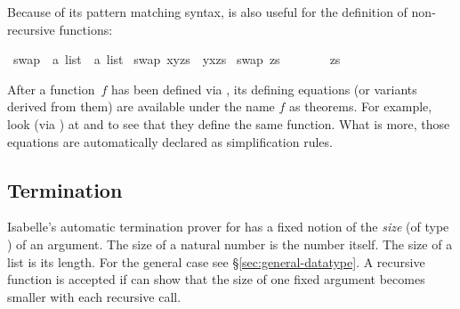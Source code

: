 \begin{isabellebody}
\begin{isamarkuptext}
Because of its pattern matching syntax,  is also useful
for the definition of non-recursive functions:%
\end{isamarkuptext}%
\isamarkuptrue%
\isamarkupfalse%
\ swap{}{}\ {\isacharcolon}{\isacharcolon}\ {\isachardoublequoteopen}{\isacharprime}a\ list\ {\isasymRightarrow}\ {\isacharprime}a\ list{\isachardoublequoteclose}\ \isanewline
{\isachardoublequoteopen}swap{}{}\ {\isacharparenleft}x{\isacharhash}y{\isacharhash}zs{\isacharparenright}\ {\isacharequal}\ y{\isacharhash}x{\isacharhash}zs{\isachardoublequoteclose}\ {\isacharbar}\isanewline
{\isachardoublequoteopen}swap{}{}\ zs\ \ \ \ \ \ \ {\isacharequal}\ zs{\isachardoublequoteclose}%
\begin{isamarkuptext}%
After a function~$f$ has been defined via ,
its defining equations (or variants derived from them) are available
under the name $f$ as theorems.
For example, look (via ) at
 and  to see that they define
the same function. What is more, those equations are automatically declared as
simplification rules.

\subsection{Termination}

Isabelle's automatic termination prover for  has a
fixed notion of the \emph{size} (of type ) of an
argument. The size of a natural number is the number itself. The size
of a list is its length. For the general case see \S\ref{sec:general-datatype}.
A recursive function is accepted if  can
show that the size of one fixed argument becomes smaller with each
recursive call.


\end{isamarkuptext}
\end{isabellebody}
